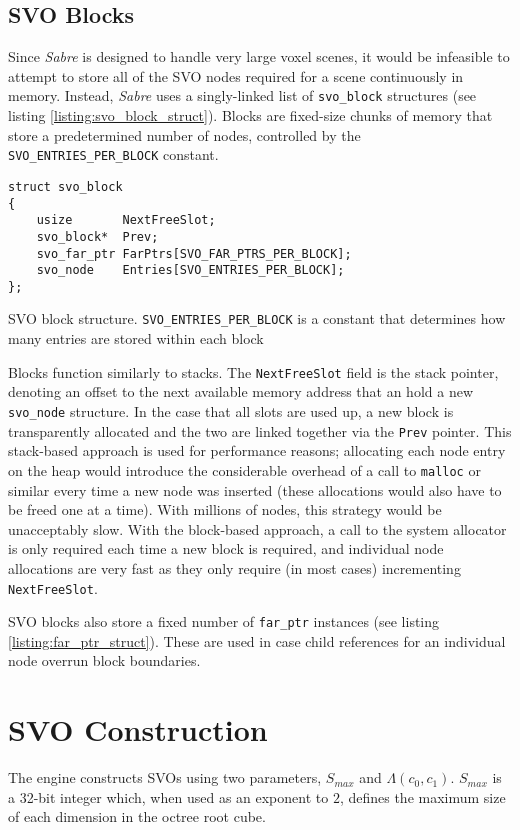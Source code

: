 \subsection{SVO Blocks}\label{sec:svo_blocks}
Since \textit{Sabre} is designed to handle very large voxel scenes, it would be infeasible to attempt to store all of the SVO nodes required for a scene continuously in memory. Instead, \textit{Sabre} uses a singly-linked list of \texttt{svo\_block} structures (see listing \ref{listing:svo_block_struct}). Blocks are fixed-size chunks of memory that store a predetermined number of nodes, controlled by the \texttt{SVO\_ENTRIES\_PER\_BLOCK} constant. 

\begin{listing}[ht]
\begin{verbatim}
struct svo_block
{
    usize       NextFreeSlot;
    svo_block*  Prev;
    svo_far_ptr FarPtrs[SVO_FAR_PTRS_PER_BLOCK];
    svo_node    Entries[SVO_ENTRIES_PER_BLOCK];
};
\end{verbatim}
\caption{SVO block structure. \texttt{SVO_ENTRIES_PER_BLOCK} is a constant that determines how many entries are stored within each block}
\label{listing:svo_block_struct}
\end{listing}

Blocks function similarly to stacks. The \texttt{NextFreeSlot} field is the stack pointer, denoting an offset to the next available memory address that an hold a new \texttt{svo\_node} structure. In the case that all slots are used up, a new block is transparently allocated and the two are linked together via the \texttt{Prev} pointer. This stack-based approach is used for performance reasons; allocating each node entry on the heap would introduce the considerable overhead of a call to \texttt{malloc} or similar every time a new node was inserted (these allocations would also have to be freed one at a time). With millions of nodes, this strategy would be unacceptably slow. With the block-based approach, a call to the system allocator is only required each time a new block is required, and individual node allocations are very fast as they only require (in most cases) incrementing \texttt{NextFreeSlot}.

SVO blocks also store a fixed number of \texttt{far\_ptr} instances (see listing \ref{listing:far_ptr_struct}). These are used in case child references for an individual node overrun block boundaries.


\section{SVO Construction}
The engine constructs SVOs using two parameters, $S_{max}$ and $\Lambda(c_0, c_1)$. $S_{max}$ is a 32-bit integer which, when used as an exponent to $2$, defines the maximum size of each dimension in the octree root cube.

